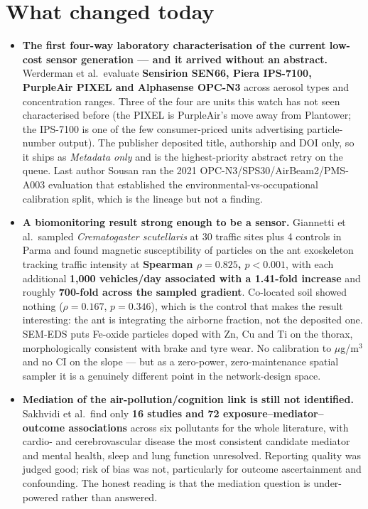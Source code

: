 \documentclass[10pt]{article}
\begin{document}
\section*{\sffamily\bfseries\color{Deep}What changed today}
\vspace{-1.5mm}{\color{Amber}\rule{\linewidth}{1.1pt}}\vspace{2.5mm}

\footnotesize
\begin{itemize}
\item \textbf{The first four-way laboratory characterisation of the current low-cost
sensor generation --- and it arrived without an abstract.} Werderman et al.\ evaluate
\textbf{Sensirion SEN66, Piera IPS-7100, PurpleAir PIXEL and Alphasense OPC-N3} across
aerosol types and concentration ranges. Three of the four are units this watch has not
seen characterised before (the PIXEL is PurpleAir's move away from Plantower; the
IPS-7100 is one of the few consumer-priced units advertising particle-number output).
The publisher deposited title, authorship and DOI only, so it ships as
\textit{Metadata only} and is the highest-priority abstract retry on the queue. Last
author Sousan ran the 2021 OPC-N3/SPS30/AirBeam2/PMS-A003 evaluation that established the
environmental-vs-occupational calibration split, which is the lineage but not a finding.

\item \textbf{A biomonitoring result strong enough to be a sensor.} Giannetti et al.\
sampled \textit{Crematogaster scutellaris} at 30 traffic sites plus 4 controls in Parma
and found magnetic susceptibility of particles on the ant exoskeleton tracking traffic
intensity at \textbf{Spearman $\rho = 0.825$, $p < 0.001$}, with each additional
\textbf{1{,}000 vehicles/day associated with a 1.41-fold increase} and roughly
\textbf{700-fold across the sampled gradient}. Co-located soil showed nothing
($\rho = 0.167$, $p = 0.346$), which is the control that makes the result interesting:
the ant is integrating the airborne fraction, not the deposited one. SEM-EDS puts Fe-oxide
particles doped with Zn, Cu and Ti on the thorax, morphologically consistent with brake
and tyre wear. No calibration to $\mu$g/m$^3$ and no CI on the slope --- but as a
zero-power, zero-maintenance spatial sampler it is a genuinely different point in the
network-design space.

\item \textbf{Mediation of the air-pollution/cognition link is still not identified.}
Sakhvidi et al.\ find only \textbf{16 studies and 72 exposure--mediator--outcome
associations} across six pollutants for the whole literature, with cardio- and
cerebrovascular disease the most consistent candidate mediator and mental health, sleep
and lung function unresolved. Reporting quality was judged good; risk of bias was not,
particularly for outcome ascertainment and confounding. The honest reading is that the
mediation question is under-powered rather than answered.


\end{itemize}
\end{document}
